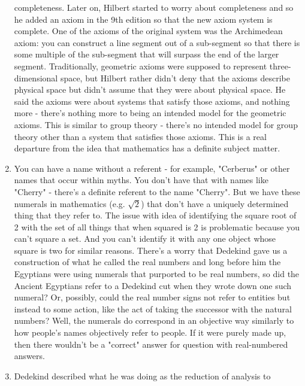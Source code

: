 \documentclass[12pt]{article}
\theoremstyle{definition}
\begin{document}
\begin{enumerate}
        completeness. Later on, Hilbert started to worry about completeness and
        so he added an axiom in the 9th edition so that the new axiom system is
        complete. One of the axioms of the original system was the Archimedean
        axiom: you can construct a line segment out of a sub-segment so that
        there is some multiple of the sub-segment that will surpass the end of
        the larger segment. Traditionally, geometric axioms were supposed to
        represent three-dimensional space, but Hilbert rather didn't deny that
        the axioms describe physical space but didn't assume that they were
        about physical space. He said the axioms were about systems that
        satisfy those axioms, and nothing more - there's nothing more to being
        an intended model for the geometric axioms. This is similar to group
        theory - there's no intended model for group theory other than a system
        that satisfies those axioms. This is a real departure from the idea
        that mathematics has a definite subject matter.
    \item
        You can have a name without a referent - for example, "Cerberus" or
        other names that occur within myths. You don't have that with names
        like "Cherry" - there's a definite referent to the name "Cherry". But
        we have these numerals in mathematics (e.g. $\sqrt{2}$) that don't have
        a uniquely determined thing that they refer to. The issue with idea of
        identifying the square root of 2 with the set of all things that when
        squared is 2 is problematic because you can't square a set. And you
        can't identify it with any one object whose square is two for similar
        reasons. There's a worry that Dedekind gave us a construction of what
        he called the real numbers and long before him the Egyptians were using
        numerals that purported to be real numbers, so did the Ancient
        Egyptians refer to a Dedekind cut when they wrote down one such
        numeral? Or, possibly, could the real number signs not refer to
        entities but instead to some action, like the act of taking the
        successor with the natural numbers? Well, the numerals do correspond in
        an objective way similarly to how people's names objectively refer to
        people. If it were purely made up, then there wouldn't be a "correct"
        answer for question with real-numbered answers.
    \item
        Dedekind described what he was doing as the reduction of analysis to

\end{enumerate}
\end{document}
